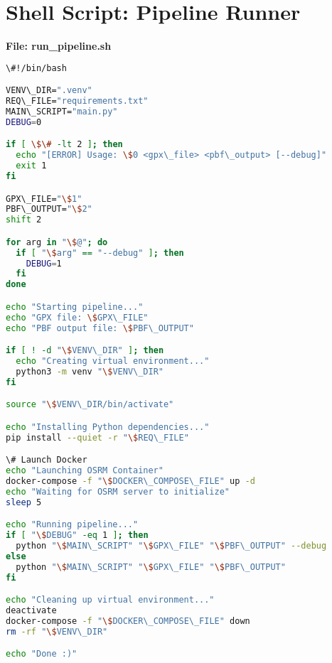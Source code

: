 \documentclass[11pt]{article}
\begin{document}
\section{Shell Script: Pipeline Runner}
\textbf{File: run\_pipeline.sh}
\begin{lstlisting}[language=bash]
\#!/bin/bash

VENV\_DIR=".venv"
REQ\_FILE="requirements.txt"
MAIN\_SCRIPT="main.py"
DEBUG=0

if [ \$\# -lt 2 ]; then
  echo "[ERROR] Usage: \$0 <gpx\_file> <pbf\_output> [--debug]"
  exit 1
fi

GPX\_FILE="\$1"
PBF\_OUTPUT="\$2"
shift 2

for arg in "\$@"; do
  if [ "\$arg" == "--debug" ]; then
    DEBUG=1
  fi
done

echo "Starting pipeline..."
echo "GPX file: \$GPX\_FILE"
echo "PBF output file: \$PBF\_OUTPUT"

if [ ! -d "\$VENV\_DIR" ]; then
  echo "Creating virtual environment..."
  python3 -m venv "\$VENV\_DIR"
fi

source "\$VENV\_DIR/bin/activate"

echo "Installing Python dependencies..."
pip install --quiet -r "\$REQ\_FILE"

\# Launch Docker
echo "Launching OSRM Container"
docker-compose -f "\$DOCKER\_COMPOSE\_FILE" up -d
echo "Waiting for OSRM server to initialize"
sleep 5

echo "Running pipeline..."
if [ "\$DEBUG" -eq 1 ]; then
  python "\$MAIN\_SCRIPT" "\$GPX\_FILE" "\$PBF\_OUTPUT" --debug
else
  python "\$MAIN\_SCRIPT" "\$GPX\_FILE" "\$PBF\_OUTPUT"
fi

echo "Cleaning up virtual environment..."
deactivate
docker-compose -f "\$DOCKER\_COMPOSE\_FILE" down
rm -rf "\$VENV\_DIR"

echo "Done :)"

\end{lstlisting}
\end{document}
